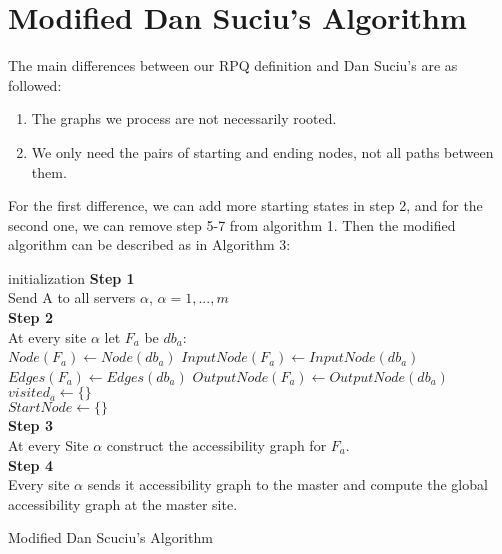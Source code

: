 \section{Modified Dan Suciu's Algorithm}
The main differences between our RPQ definition and Dan Suciu's are as followed:
\begin{enumerate}
    \item The graphs we process are not necessarily rooted.
    \item We only need the pairs of starting and ending nodes, not all paths between them.
\end{enumerate}
For the first difference, we can add more starting states in step 2, and for the second one, we can remove step 5-7 from algorithm 1. Then the modified algorithm can be described as in Algorithm 3:
\begin{algorithm}
    initialization\;
    \textbf{Step 1} \\Send A to all servers $\alpha$, $\alpha = 1,...,m$\\
    \textbf{Step 2} \\At every site $\alpha$ let $F_a$ be $db_a$:\\
                        $Node(F_a)\leftarrow Node(db_a)$
                        $InputNode(F_a)\leftarrow InputNode(db_a)$
                        $Edges(F_a)\leftarrow Edges(db_a)$
                        $OutputNode(F_a)\leftarrow OutputNode(db_a)$
                        $visited_a\leftarrow\{\}$\\
                        $StartNode\leftarrow\{\}$ \\
    \textbf{Step 3} \\At every Site $\alpha$ construct the accessibility graph for $F_a$.\\
    \textbf{Step 4} \\Every site $\alpha$ sends it accessibility graph to the master and compute the global accessibility graph at the master site.
    \caption{Modified Dan Scuciu's Algorithm}
\end{algorithm}
